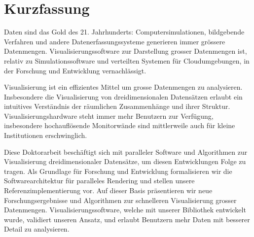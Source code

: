 
\chapter*{Kurzfassung}

Daten sind das Gold des 21. Jahrhunderts: Computersimulationen, bildgebende
Verfahren und andere Datenerfassungssysteme generieren immer gr\"ossere
Datenmengen. Visualisierungssoftware zur Darstellung grosser Datenmengen ist,
relativ zu Simulationssoftware und verteilten Systemen f\"ur Cloudumgebungen,
in der Forschung und Entwicklung vernachl\"assigt.

Visualisierung ist ein effizientes Mittel um grosse Datenmengen zu analysieren.
Insbesondere die Visualisierung von dreidimensionalen Datens\"atzen erlaubt ein
intuitives Verst\"andnis der r\"aumlichen Zusammenh\"ange und ihrer Struktur.
Visualisierungshardware steht immer mehr Benutzern zur Verf\"ugung,
insbesondere hochaufl\"osende Monitorw\"ande sind mittlerweile auch f\"ur
kleine Institutionen erschwinglich.

Diese Doktorarbeit besch\"aftigt sich mit paralleler Software und Algorithmen
zur Visualisierung dreidimensionaler Datens\"atze, um diesen Entwicklungen
Folge zu tragen. Als Grundlage f\"ur Forschung und Entwicklung formalisieren
wir die Softwarearchitektur f\"ur paralleles Rendering und stellen unsere
Referenzimplementierung vor. Auf dieser Basis pr\"asentieren wir neue
Forschungsergebnisse und Algorithmen zur schnelleren Visualisierung grosser
Datenmengen. Visualisierungssoftware, welche mit unserer Bibliothek entwickelt
wurde, validiert unseren Ansatz, und erlaubt Benutzern mehr Daten mit besserer
Detail zu analysieren.

